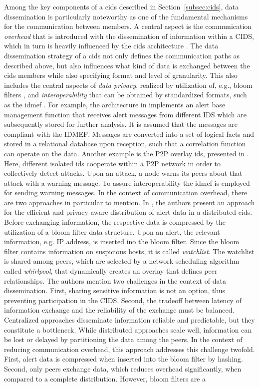 \documentclass[../../main.tex]{subfiles}
\begin{document}
Among the key components of a \gls{cids} described in Section~\ref{subsec:cids}, data dissemination is particularly noteworthy as one of the fundamental mechanisms for the communication between members. A central aspect is the communication \textit{overhead} that is introduced with the dissemination of information within a CIDS, which in turn is heavily influenced by the \gls{cids} architecture \cite[p.39]{vasilomanolakis_collaborative_2016}. The data dissemination strategy of a \gls{cids}  not only defines the communication paths as described above, but also influences what kind of data is exchanged between the \gls{cids}  members while also specifying format and level of granularity. This also includes the central aspects of \textit{data privacy}, realized by utilization of, e.g., bloom filters \cite{Vasilomanolakis2015SkipMon}\cite{Locasto2005}, and \textit{interoperability} that can be obtained by standardized formats, such as the \gls{idmef} \cite{debar2007intrusion}. For example, the architecture in \cite{Cuppens2002} implements an alert base management function that receives alert messages from different IDS which are subsequently stored for further analysis. It is assumed that the messages are compliant with the IDMEF. Messages are converted into a set of logical facts and stored in a relational database upon reception, such that a correlation function can operate on the data. Another example is the P2P overlay \gls{ids}, presented in \cite{Duma2006}. Here, different isolated \gls{ids} cooperate within a P2P network in order to collectively detect attacks. Upon an attack, a node warns its peers about that attack with a warning message. To assure interoperability the \gls{idmef} is employed for sending warning messages. In the context of communication overhead, there are two approaches in particular to mention. In \cite{Locasto2005}, the authors present an approach for the efficient and privacy aware distribution of alert data in a distributed \gls{cids}. Before exchanging information, the respective data is compressed by the utilization of a bloom filter data structure. Upon an alert, the relevant information, e.g. IP address, is inserted ino the bloom filter. Since the bloom filter contains information on suspicious hosts, it is called \textit{watchlist}. The watchlist is shared among peers, which are selected by a network scheduling algorithm called \textit{whirlpool}, that dynamically creates an overlay that defines peer relationships. The authors mention two challenges in the context of data dissemination. First, sharing sensitive information is not an option, thus preventing participation in the CIDS. Second, the tradeoff between latency of information exchange and the reliability of the exchange must be balanced. Centralized approaches disseminate information reliable and predictable, but they constitute a bottleneck. While distributed approaches scale well, information can be lost or delayed by partitioning the data among the peers. In the context of reducing communication overhead, this approach addresses this challenge twofold. First, alert data is compressed when inserted into the bloom filter by hashing. Second, only peers exchange data, which reduces overhead significantly, when compared to a complete distribution. However, bloom filters are a 
\end{document}
